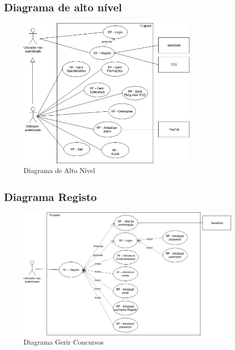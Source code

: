 \subsection{Diagrama de alto nível}
\label{d:altonivel}
\begin{figure}[ht!]
	\begin{center}
		\includegraphics[width=0.8\textwidth]{img/rf/alto-nivel}
		\caption{Diagrama de Alto Nível}
		\label{fig:rf-alto-nivel}
	\end{center}
\end{figure}

\newpage

\subsection{Diagrama Registo}
\label{d:registo}
\begin{figure}[ht!]
	\begin{center}
		\includegraphics[width=1\textwidth]{img/rf/registo}
		\caption{Diagrama Gerir Concursos}
		\label{fig:rf-registo}
	\end{center}
\end{figure}

